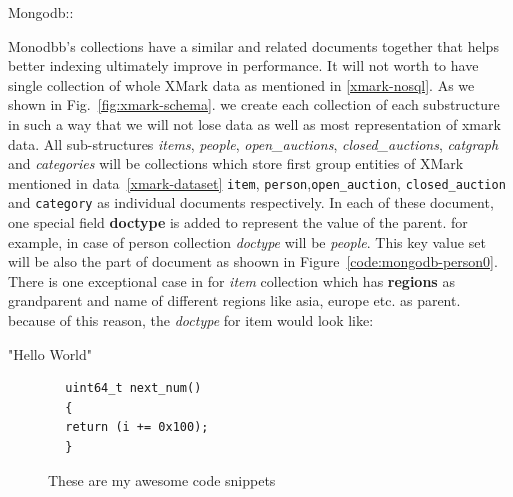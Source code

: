 Mongodb::

Monodbb's collections have a similar and related documents together that helps better indexing ultimately improve in performance. It will not worth to have single collection of whole XMark data as mentioned in \ref{xmark-nosql}. As we shown in Fig.~\ref{fig:xmark-schema}. we create each collection of each substructure in such a way that we will not lose data as well as most representation of xmark data. All sub-structures \textit{items}, \textit{people}, \textit{open\_auctions}, \textit{closed\_auctions}, \textit{catgraph} and \textit{categories} will be collections which store first group entities of XMark mentioned in data~\ref{xmark-dataset} \texttt{item}, \texttt{person},\texttt{open\_auction}, \texttt{closed\_auction} and \texttt{category} as individual documents respectively. In each of these document, one special field \textbf{doctype} is added to represent the value of the parent. for example, in case of person collection \textit{doctype} will be \textit{people}. This key value set will be also the part of document as shoown in Figure~\ref{code:mongodb-person0}. There is one exceptional case in for \textit{item} collection which has \textbf{regions} as grandparent and name of different regions like asia, europe etc. as parent. because of this reason, the \textit{doctype} for item would look like:
\label{code:xmark-mongo-doctype}


	\newsavebox{\firstlisting}
	\begin{lrbox}{\firstlisting}%
		\begin{fakeJSON}[caption=Anonymous JSON value,label={json-anonymous}]
			"Hello World"
		\end{fakeJSON}
	\end{lrbox}
	\newsavebox{\secondlisting}
	\begin{lrbox}{\secondlisting}%
		\begin{lstlisting}
		uint64_t next_num()
		{
		return (i += 0x100);
		}
		\end{lstlisting}
	\end{lrbox}
	
	\begin{figure}[h]
		\caption{These are my awesome code snippets} \label{fig:algOffset}
	\end{figure}